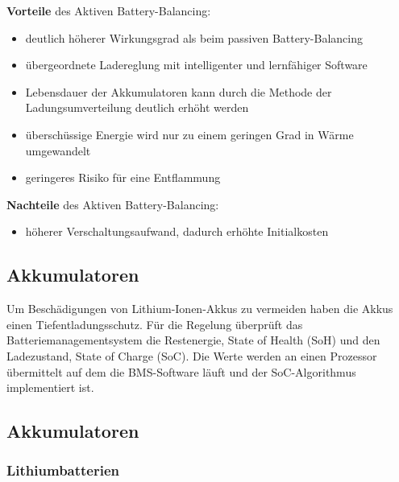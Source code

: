 \textbf{Vorteile} des Aktiven Battery-Balancing:
\begin{itemize}
\item {deutlich höherer Wirkungsgrad als beim passiven Battery-Balancing} \medskip\\
\item {übergeordnete Ladereglung mit intelligenter und lernfähiger Software} \medskip\\
\item {Lebensdauer der Akkumulatoren kann durch die Methode der Ladungsumverteilung deutlich erhöht werden} \medskip\\
\item {überschüssige Energie wird nur zu einem geringen Grad in Wärme umgewandelt} \medskip\\
\item {geringeres Risiko für eine Entflammung} \medskip\\
\end{itemize}

\textbf{Nachteile} des Aktiven Battery-Balancing:
\begin{itemize}
\item {höherer Verschaltungsaufwand, dadurch erhöhte Initialkosten} \medskip\\
\end{itemize}

\subsection{Akkumulatoren}
Um Beschädigungen von Lithium-Ionen-Akkus zu vermeiden haben die Akkus einen Tiefentladungsschutz. Für die Regelung überprüft das Batteriemanagementsystem die Restenergie, State of Health (SoH) und den Ladezustand, State of Charge (SoC). Die Werte werden an einen Prozessor übermittelt auf dem die BMS-Software läuft und der SoC-Algorithmus implementiert ist.


\subsection{Akkumulatoren}
\subsubsection{Lithiumbatterien}

